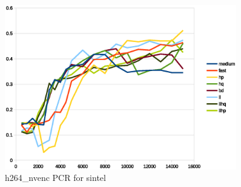 \documentclass[12pt,twoside]{article}
\begin{document}
\begin{figure}[!h]
	\vspace{-10pt}
	\centering
	\includegraphics[width=0.9\textwidth]{img/h264_nvencSintelPCR.eps}
	\caption{h264\_nvenc PCR for sintel}
	\label{fig:h264_nvencSintelPCR}
\end{figure}
\end{document}

